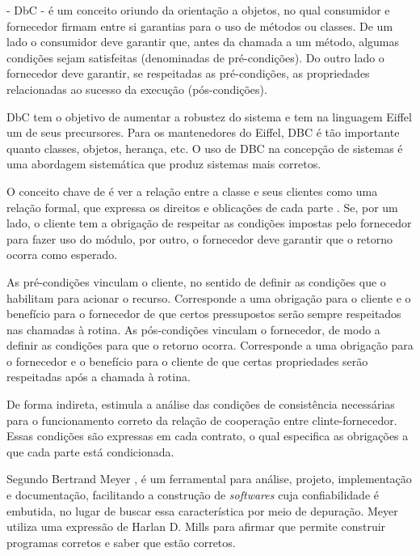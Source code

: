 \cite{meyer1988object}


\designbycontract{} \cite{meyer1992applying} - DbC - é um conceito
oriundo da orientação a objetos, no qual consumidor e fornecedor firmam entre si garantias para
o uso de métodos ou classes. De um lado o consumidor deve garantir que, antes da
chamada a um método, algumas condições sejam satisfeitas (denominadas de pré-condições).
Do outro lado o fornecedor deve garantir, se respeitadas as pré-condições,
as propriedades relacionadas ao sucesso da execução (pós-condições).


DbC tem o objetivo de aumentar a robustez do sistema e tem na linguagem Eiffel
\cite{meyer1988eiffel} um de seus precursores. Para os mantenedores do Eiffel, DBC é
tão importante quanto classes, objetos, herança, etc. O uso de DBC na
concepção de sistemas é uma abordagem sistemática que produz sistemas mais
corretos.

O conceito chave de \designbycontract{} é ver a relação entre a classe e
seus clientes como uma relação formal, que expressa os direitos e oblicações de
cada parte \cite{meyer1997object}. Se, por um lado, o cliente tem a obrigação de
respeitar as condições impostas pelo fornecedor para fazer uso do módulo, por
outro, o fornecedor deve garantir que o retorno ocorra como esperado.

As pré-condições vinculam o cliente, no sentido de definir as condições que
o habilitam para acionar o recurso. Corresponde a uma obrigação para o cliente e
o benefício para o fornecedor \cite{meyer1997object} de que certos
pressupostos serão sempre respeitados nas chamadas à rotina.
As pós-condições vinculam o fornecedor, de modo a definir as condições para que o retorno ocorra.
Corresponde a uma obrigação para o fornecedor e o benefício para o cliente de
que certas propriedades serão respeitadas após a chamada à rotina.

De forma indireta, \designbycontract{} estimula a análise das condições de
consistência necessárias para o funcionamento correto da relação de cooperação entre clinte-fornecedor.
Essas condições são expressas em cada contrato, o qual especifica as obrigações
a que cada parte está condicionada. 

Segundo Bertrand Meyer \cite{meyer1997object}, \designbycontract{} é um
ferramental para análise, projeto, implementação e documentação, facilitando a
construção de \textit{softwares} cuja confiabilidade é embutida, no lugar de
buscar essa característica por meio de depuração. Meyer utiliza uma expressão de
Harlan D. Mills \cite{mills1975new} para afirmar que \designbycontract permite
construir programas corretos e saber que estão corretos.


